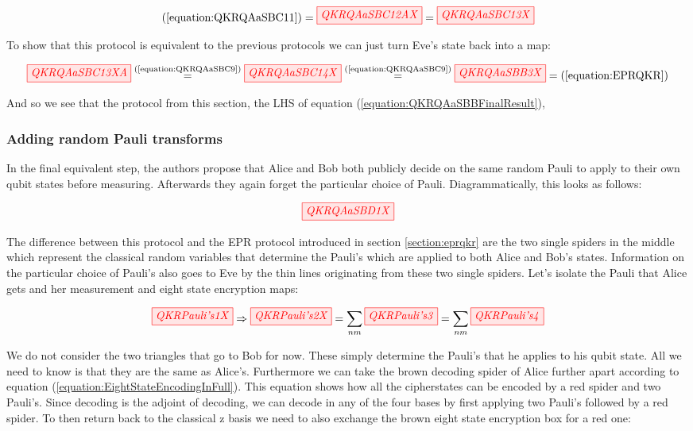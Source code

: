 \documentclass[]{article}
\newcommand{\equaltext}[1]{\ensuremath{\stackrel{\text{#1}}{=}}}
\begin{document}
\begin{equation}
	\label{equation:QKRQAaSBC13}
	(\ref{equation:QKRQAaSBC11}) = \tikzfig{QKRQAaSBC12AX} = \tikzfig{QKRQAaSBC13X}
\end{equation}

To show that this protocol is equivalent to the previous protocols we can just turn Eve's state back into a map:

\begin{equation}
\label{equation:QKRQAaSBBFinalResult}
	\tikzfig{QKRQAaSBC13XA} \equaltext{(\ref{equation:QKRQAaSBC9})} \tikzfig{QKRQAaSBC14X} \equaltext{(\ref{equation:QKRQAaSBC9})} \tikzfig{QKRQAaSBB3X} = (\ref{equation:EPRQKR})
\end{equation}

And so we see that the protocol from this section, the LHS of equation (\ref{equation:QKRQAaSBBFinalResult}),

\subsubsection{Adding random Pauli transforms}

In the final equivalent step, the authors propose that Alice and Bob both publicly decide on the same random Pauli to apply to their own qubit states before measuring. Afterwards they again forget the particular choice of Pauli. Diagrammatically, this looks as follows: 

\begin{equation}
\label{equation:QKRQAaSBD1}
\tikzfig{QKRQAaSBD1X}
\end{equation}

The difference between this protocol and the EPR protocol introduced in section \ref{section:eprqkr} are the two single spiders in the middle which represent the classical random variables that determine the Pauli's which are applied to both Alice and Bob's states. Information on the particular choice of Pauli's also goes to Eve by the thin lines originating from these two single spiders. Let's isolate the Pauli that Alice gets and her measurement and eight state encryption maps:

\begin{equation}
	\label{equation:QKRPauli's}
	\tikzfig{QKRPauli's1X} \Rightarrow \tikzfig{QKRPauli's2X} = \sum\limits_{nm} \tikzfig{QKRPauli's3}  = \sum\limits_{nm} \tikzfig{QKRPauli's4}
\end{equation}

We do not consider the two triangles that go to Bob for now. These simply determine the Pauli's that he applies to his qubit state. All we need to know is that they are the same as Alice's. Furthermore we can take the brown decoding spider of Alice further apart according to equation (\ref{equation:EightStateEncodingInFull}). This equation shows how all the cipherstates can be encoded by a red spider and two Pauli's. Since decoding is the adjoint of decoding, we can decode in any of the four bases by first applying two Pauli's followed by a red spider. To then return back to the classical z basis we need to also exchange the brown eight state encryption box for a red one:
\end{document}
